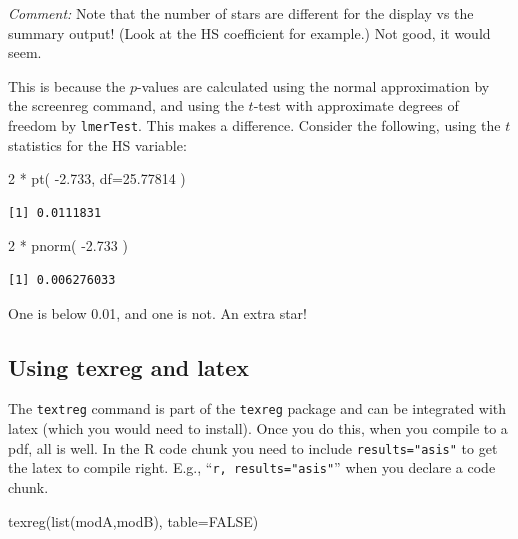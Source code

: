 \documentclass[
  letterpaper,
  DIV=11,
  numbers=noendperiod]{scrreprt}
\newenvironment{Shaded}{\begin{snugshade}}{\end{snugshade}}
\newcommand{\AttributeTok}[1]{\textcolor[rgb]{0.49,0.56,0.16}{#1}}
\newcommand{\ConstantTok}[1]{\textcolor[rgb]{0.53,0.00,0.00}{#1}}
\newcommand{\DecValTok}[1]{\textcolor[rgb]{0.25,0.63,0.44}{#1}}
\newcommand{\FloatTok}[1]{\textcolor[rgb]{0.25,0.63,0.44}{#1}}
\newcommand{\FunctionTok}[1]{\textcolor[rgb]{0.02,0.16,0.49}{#1}}
\newcommand{\NormalTok}[1]{\textcolor[rgb]{0.00,0.44,0.13}{#1}}
\newcommand{\SpecialCharTok}[1]{\textcolor[rgb]{0.25,0.44,0.63}{#1}}
\begin{document}
\emph{Comment:} Note that the number of stars are different for the
display vs the summary output! (Look at the HS coefficient for example.)
Not good, it would seem.

This is because the \(p\)-values are calculated using the normal
approximation by the screenreg command, and using the \(t\)-test with
approximate degrees of freedom by \texttt{lmerTest}. This makes a
difference. Consider the following, using the \(t\) statistics for the
HS variable:

\begin{Shaded}
\begin{Highlighting}[]
\DecValTok{2} \SpecialCharTok{*} \FunctionTok{pt}\NormalTok{( }\SpecialCharTok{{-}}\FloatTok{2.733}\NormalTok{, }\AttributeTok{df=}\FloatTok{25.77814}\NormalTok{ )}
\end{Highlighting}
\end{Shaded}

\begin{verbatim}
[1] 0.0111831
\end{verbatim}

\begin{Shaded}
\begin{Highlighting}[]
\DecValTok{2} \SpecialCharTok{*} \FunctionTok{pnorm}\NormalTok{( }\SpecialCharTok{{-}}\FloatTok{2.733}\NormalTok{ )}
\end{Highlighting}
\end{Shaded}

\begin{verbatim}
[1] 0.006276033
\end{verbatim}

One is below 0.01, and one is not. An extra star!

\hypertarget{using-texreg-and-latex}{%
\subsection{Using texreg and latex}\label{using-texreg-and-latex}}

The \texttt{textreg} command is part of the \texttt{texreg} package and
can be integrated with latex (which you would need to install). Once you
do this, when you compile to a pdf, all is well. In the R code chunk you
need to include \texttt{results="asis"} to get the latex to compile
right. E.g., ``\texttt{r,\ results="asis"}'' when you declare a code
chunk.

\begin{Shaded}
\begin{Highlighting}[]
\FunctionTok{texreg}\NormalTok{(}\FunctionTok{list}\NormalTok{(modA,modB), }\AttributeTok{table=}\ConstantTok{FALSE}\NormalTok{)}
\end{Highlighting}
\end{Shaded}
\end{document}
